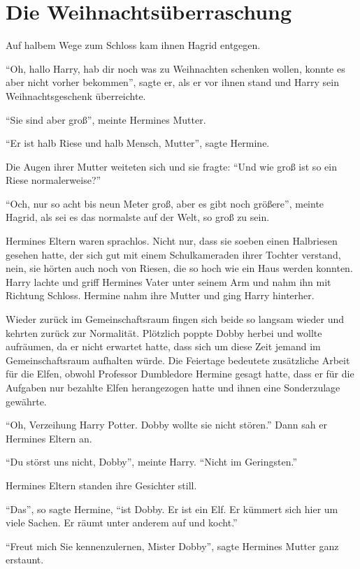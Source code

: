 \chapter{Die Weihnachtsüberraschung}


Auf halbem Wege zum Schloss kam ihnen Hagrid entgegen.

\enquote{Oh, hallo Harry, hab dir noch was zu Weihnachten schenken wollen, konnte es aber nicht vorher bekommen}, sagte er, als er vor ihnen stand und Harry sein Weihnachtsgeschenk überreichte.

\enquote{Sie sind aber groß}, meinte Hermines Mutter.

\enquote{Er ist halb Riese und halb Mensch, Mutter}, sagte Hermine.

Die Augen ihrer Mutter weiteten sich und sie fragte: \enquote{Und wie groß ist so ein Riese normalerweise?}

\enquote{Och, nur so acht bis neun Meter groß, aber es gibt noch größere}, meinte Hagrid, als sei es das normalste auf der Welt, so groß zu sein.

Hermines Eltern waren sprachlos. Nicht nur, dass sie soeben einen Halbriesen gesehen hatte, der sich gut mit einem Schulkameraden ihrer Tochter verstand, nein, sie hörten auch noch von Riesen, die so hoch wie ein Haus werden konnten. Harry lachte und griff Hermines Vater unter seinem Arm und nahm ihn mit Richtung Schloss. Hermine nahm ihre Mutter und ging Harry hinterher.

Wieder zurück im Gemeinschaftsraum fingen sich beide so langsam wieder und kehrten zurück zur Normalität. Plötzlich poppte Dobby herbei und wollte aufräumen, da er nicht erwartet hatte, dass sich um diese Zeit jemand im Gemeinschaftsraum aufhalten würde. Die Feiertage bedeutete zusätzliche Arbeit für die Elfen, obwohl Professor Dumbledore Hermine gesagt hatte, dass er für die Aufgaben nur bezahlte Elfen herangezogen hatte und ihnen eine Sonderzulage gewährte.

\enquote{Oh, Verzeihung Harry Potter. Dobby wollte sie nicht stören.} Dann sah er Hermines Eltern an.

\enquote{Du störst uns nicht, Dobby}, meinte Harry. \enquote{Nicht im Geringsten.}

Hermines Eltern standen ihre Gesichter still.

\enquote{Das}, so sagte Hermine, \enquote{ist Dobby. Er ist ein Elf. Er kümmert sich hier um viele Sachen. Er räumt unter anderem auf und kocht.}

\enquote{Freut mich Sie kennenzulernen, Mister Dobby}, sagte Hermines Mutter ganz erstaunt.

